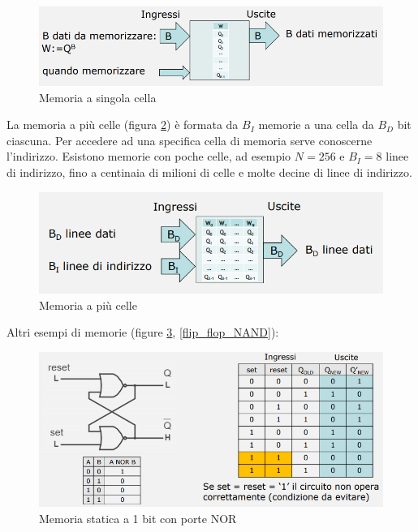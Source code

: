 \documentclass{article}
\begin{document}
\begin{figure}[h]
  \centering
  \includegraphics[scale=0.7]{IM_memoria_1_cella}
  \caption{Memoria a singola cella}
  \label{memoria_1_cella}
\end{figure}

La memoria a più celle (figura \ref{memoria_piu_celle}) è formata da $B_I$ memorie a una cella da $B_D$ bit ciascuna. Per accedere ad una specifica cella di memoria serve conoscerne l'indirizzo. Esistono memorie con poche celle, ad esempio $N = 256$ e $B_I = 8$ linee di indirizzo, fino a centinaia di milioni di celle e molte decine di linee di indirizzo.

\begin{figure}[h]
  \centering
  \includegraphics[scale=0.7]{IM_memoria_piu_celle}
  \caption{Memoria a più celle}
  \label{memoria_piu_celle}
\end{figure}
Altri esempi di memorie (figure \ref{flip_flop_NOR}, \ref{flip_flop_NAND}):
\begin{figure}[h]
  \centering
  \includegraphics[scale=0.5]{IM_flip_flop_NOR}
  \caption{Memoria statica a 1 bit con porte NOR}
  \label{flip_flop_NOR}
\end{figure}
\end{document}
